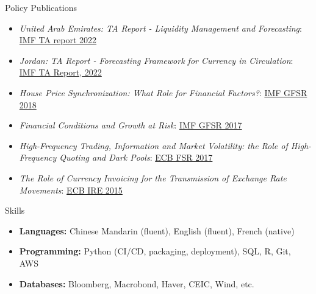 \documentclass[usegeometry, 10pt, a4paper]{cv} %
\begin{document}
\begin{rubriquetableau}[0.95\textwidth]{Policy Publications}\\
  \vspace{-0.8cm}
\begin{itemize}
\item \textit{United Arab Emirates: TA Report - Liquidity Management and Forecasting}: \href{https://www.imf.org/en/Publications/CR/Issues/2022/07/22/United-Arab-Emirates-Technical-Assistance-Report-Liquidity-Management-and-Forecasting-521194}{IMF TA report 2022}
\item \textit{Jordan: TA Report - Forecasting Framework for Currency in Circulation}: \href{https://www.imf.org/en/Publications/CR/Issues/2022/04/07/Jordan-Technical-Assistance-Report-Forecasting-Framework-for-Currency-in-Circulation-516259}{IMF TA Report, 2022} 
\item \textit{House Price Synchronization: What Role for Financial Factors?}: \href{https://www.elibrary.imf.org/view/book/9781484338292/ch003.xml}{IMF GFSR 2018}
\item \textit{Financial Conditions and Growth at Risk}: \href{https://www.elibrary.imf.org/view/book/9781484308394/ch003.xml}{IMF GFSR 2017}
\item \textit{High-Frequency Trading, Information and Market Volatility: the Role of High-Frequency
Quoting and Dark Pools}: \href{https://www.ecb.europa.eu/pub/pdf/other/ecbmpbu201610.en.pdf}{ECB FSR 2017}
\item \textit{The Role of Currency Invoicing for the Transmission of Exchange Rate Movements}: \href{https://www.ecb.europa.eu/pub/pdf/ire/article/ecb.ireart201507_01~5e577ddb0f.en.pdf}{ECB IRE 2015} 
\end{itemize}
\end{rubriquetableau}


\begin{rubriquetableau}[0.98\textwidth]{Skills}
  \vspace{-0.5cm}  
  \begin{itemize}
    \item \textbf{Languages:} Chinese Mandarin (fluent), English (fluent), French (native)
    \item \textbf{Programming:} Python (CI/CD, packaging, deployment), SQL, R, Git, AWS 
    \item \textbf{Databases:} Bloomberg, Macrobond, Haver, CEIC, Wind, etc.
  \end{itemize}
  \end{rubriquetableau}
\end{document}
